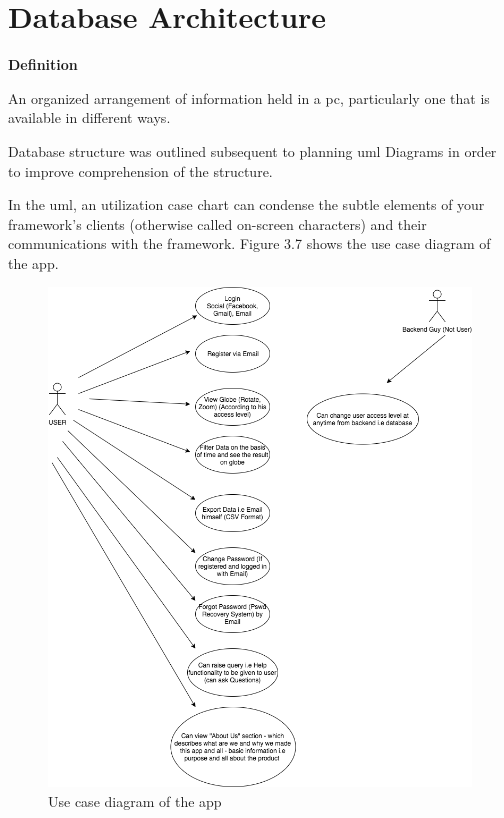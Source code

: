 \section{Database Architecture}

\textbf{Definition}

An organized arrangement of information held in a \gls{pc}, particularly one that is available in different ways.


Database structure was outlined subsequent to planning \gls{uml} Diagrams in order to improve comprehension of the structure.

In the \gls{uml}, an utilization case chart can condense the subtle elements of your framework's clients (otherwise called on-screen characters) and their communications with the framework. Figure 3.7 shows the use case diagram of the app.

    \begin{figure}[H]
            \centering
            \includegraphics[width=1.0\linewidth]{figures/ch3/usecase.png}
            \caption{\label{fig:wireframe_3} Use case diagram of the app}
    \end{figure}

